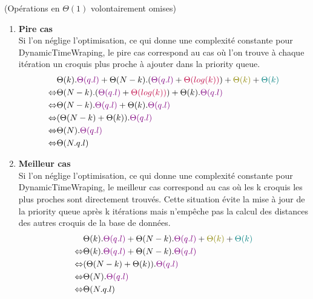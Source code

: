 \documentclass[a4paper, 11pt]{article}
\begin{document}
    (Opérations en $\Theta(1)$ volontairement omises)\\
    
    \begin{enumerate}
    \item \textbf{Pire cas}\\
    Si l'on néglige l’optimisation, ce qui donne une complexité constante pour DynamicTimeWraping, le pire cas correspond au cas où l'on trouve à chaque itération un croquis plus proche à ajouter dans la priority queue.
    \begin{align*}
    & \Theta(k).\textcolor{violet}{\Theta(q.l)} + \Theta(N-k).(\textcolor{violet}{\Theta(q.l)}+\textcolor{purple}{\Theta(log(k))}) + \textcolor{olive}{\Theta(k)} + \textcolor{teal}{\Theta(k)}\\
    \Leftrightarrow & \Theta(N-k).(\textcolor{violet}{\Theta(q.l)} + \textcolor{purple}{\Theta(log(k))}) + \Theta(k).\textcolor{violet}{\Theta(q.l)}\\
    \Leftrightarrow & \Theta(N-k).\textcolor{violet}{\Theta(q.l)} + \Theta(k).\textcolor{violet}{\Theta(q.l)}\\
    \Leftrightarrow & ( \Theta(N-k)+\Theta(k)).\textcolor{violet}{\Theta(q.l)}\\
    \Leftrightarrow & \Theta(N).\textcolor{violet}{\Theta(q.l)}\\
    \Leftrightarrow & \Theta(N.q.l)
    \end{align*}
    
    \item \textbf{Meilleur cas}\\
    Si l'on néglige l’optimisation, ce qui donne une complexité constante pour DynamicTimeWraping, le meilleur cas correspond au cas où les k croquis les plus proches sont directement trouvés. Cette situation évite la mise à jour de la priority queue après k itérations mais n'empêche pas la calcul des distances des autres croquis de la base de données.
    \begin{align*}
    & \Theta(k).\textcolor{violet}{\Theta(q.l)} + \Theta(N-k).\textcolor{violet}{\Theta(q.l)} + \textcolor{olive}{\Theta(k)} + \textcolor{teal}{\Theta(k)}\\
    \Leftrightarrow & \Theta(k).\textcolor{violet}{\Theta(q.l)} + \Theta(N-k).\textcolor{violet}{\Theta(q.l)}\\
    \Leftrightarrow & ( \Theta(N-k)+\Theta(k)).\textcolor{violet}{\Theta(q.l)}\\
    \Leftrightarrow & \Theta(N).\textcolor{violet}{\Theta(q.l)}\\
    \Leftrightarrow & \Theta(N.q.l)
    \end{align*}
    \end{enumerate}
    
\end{document}
